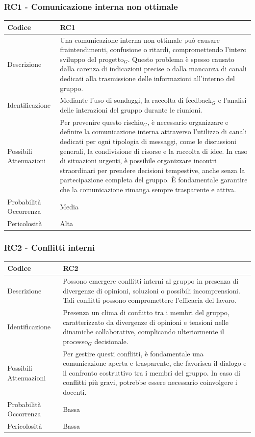 \documentclass[10pt]{article}
\begin{document}
{    \subsubsection{RC1 - Comunicazione interna non ottimale}
    \label{RC1}
    \begin{tabularx}{\textwidth}{|l|X|}
    \hline
    \rowcolor{gray!25}
    Codice & RC1 \\
    \hline
    Descrizione & Una comunicazione interna non ottimale può causare fraintendimenti, confusione o ritardi, compromettendo l’intero sviluppo del progetto$_G$. Questo problema è spesso causato dalla carenza di indicazioni precise o dalla mancanza di canali dedicati alla trasmissione delle informazioni all’interno del gruppo. \\
    \hline
    Identificazione & Mediante l'uso di sondaggi, la raccolta di feedback$_G$ e l'analisi delle interazioni del gruppo durante le riunioni.   \\
    \hline
    Possibili Attenuazioni & Per prevenire questo rischio$_G$, è necessario organizzare e definire la comunicazione interna attraverso l’utilizzo di canali dedicati per ogni tipologia di messaggi, come le discussioni generali, la condivisione di risorse e la raccolta di idee. In caso di situazioni urgenti, è possibile organizzare incontri straordinari per prendere decisioni tempestive, anche senza la partecipazione completa del gruppo. È fondamentale garantire che la comunicazione rimanga sempre trasparente e attiva. \\
    \hline
    Probabilità Occorrenza &  Media \\
    \hline
    Pericolosità & Alta \\ 
    \hline
    \end{tabularx}
    
    \subsubsection{RC2 - Conflitti interni}
    \label{RC2}
    \begin{tabularx}{\textwidth}{|l|X|}
    \hline
    \rowcolor{gray!25}
    Codice & RC2 \\
    \hline
    Descrizione & Possono emergere conflitti interni al gruppo in presenza di divergenze di opinioni, soluzioni o possibili incomprensioni. Tali conflitti possono compromettere l'efficacia del lavoro. \\
    \hline
    Identificazione & Presenza un clima di conflitto tra i membri del gruppo, caratterizzato da divergenze di opinioni e tensioni nelle dinamiche collaborative, complicando ulteriormente il processo$_G$ decisionale.   \\
    \hline
    Possibili Attenuazioni &  Per gestire questi conflitti, è fondamentale una comunicazione aperta e trasparente, che favorisca il dialogo e il confronto costruttivo tra i membri del gruppo. In caso di conflitti più gravi, potrebbe essere necessario coinvolgere i docenti. \\
    \hline
    Probabilità Occorrenza &  Bassa \\
    \hline
    Pericolosità & Bassa \\ 
    \hline
    \end{tabularx}
    

}
\end{document}
